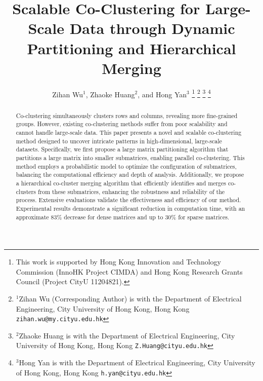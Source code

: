 \documentclass[letterpaper, 10 pt, conference]{ieeeconf}  %
\title{\LARGE \bf Scalable Co-Clustering for Large-Scale Data through Dynamic Partitioning and Hierarchical Merging}
\author{Zihan Wu$^{1}$, Zhaoke Huang$^{2}$, and Hong Yan$^{3}$%
\thanks{This work is supported by Hong Kong Innovation and
Technology Commission (InnoHK Project CIMDA) and Hong
Kong Research Grants Council (Project CityU 11204821).}%
\thanks{$^{1}$Zihan Wu (Corresponding Author) is with the Department of Electrical Engineering,
        City University of Hong Kong, Hong Kong
        {\tt\small zihan.wu@my.cityu.edu.hk}}%
\thanks{$^{2}$Zhaoke Huang is with the Department of Electrical Engineering,
        City University of Hong Kong, Hong Kong
        {\tt\small Z.Huang@cityu.edu.hk}}%
\thanks{$^{3}$Hong Yan is with the Department of Electrical Engineering,
        City University of Hong Kong, Hong Kong
        {\tt\small h.yan@cityu.edu.hk}}%
}
\begin{document}
\maketitle

\thispagestyle{empty}
\pagestyle{empty}


\begin{abstract}
Co-clustering simultaneously clusters rows and columns, revealing more fine-grained groups. However, existing co-clustering methods suffer from poor scalability and cannot handle large-scale data. This paper presents a novel and scalable co-clustering method designed to uncover intricate patterns in high-dimensional, large-scale datasets. Specifically, we first propose a large matrix partitioning algorithm that partitions a large matrix into smaller submatrices, enabling parallel co-clustering. This method employs a probabilistic model to optimize the configuration of submatrices, balancing the computational efficiency and depth of analysis.
Additionally, we propose a hierarchical co-cluster merging algorithm that efficiently identifies and merges co-clusters from these submatrices, enhancing the robustness and reliability of the process. Extensive evaluations validate the effectiveness and efficiency of our method. Experimental results demonstrate a significant reduction in computation time, with an approximate 83\% decrease for dense matrices and up to 30\% for sparse matrices.

\end{abstract}
\end{document}
